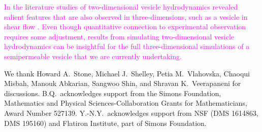 \documentclass[prb,preprint,showpacs,preprintnumbers,amsmath,amssymb,longbibliography]{revtex4-1}
\begin{document}
\textcolor{magenta}{In the literature studies of
two-dimensional vesicle hydrodynamics revealed salient features that are also observed in three-dimensions, such as a vesicle in shear flow \cite{GhigliottiBibenMisbah2010_JFM,AgarwalBiros2020_PRF}. Even though quantitative connection to  experimental observation requires some adjustment, results from simulating two-dimensional vesicle hydrodynamics can be insightful for the full three-dimensional simulations of a semipermeable vesicle that we are currently undertaking.
}



\acknowledgments
We thank Howard A.~Stone, Michael J.~Shelley, Petia M.~Vlahovska,
Chaoqui Misbah, Manouk Abkarian, Sangwoo Shin, and Shravan
K.~Veerapaneni for discussions. B.Q.~acknowledges support from the
Simons Foundation, Mathematics and Physical Sciences-Collaboration
Grants for Mathematicians, Award Number 527139. Y.-N.Y.~acknowledges
support from NSF (DMS 1614863, DMS 195160) and Flatiron Institute, part
of Simons Foundation.

\bigskip
 

\end{document}
